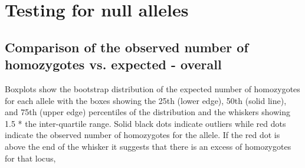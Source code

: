 \documentclass[a4paper]{scrartcl}\usepackage[]{graphicx}\usepackage[]{color}
\begin{document}
\FloatBarrier

\FloatBarrier

\FloatBarrier

\section{Testing for null alleles}




\subsection{Comparison of the observed number of homozygotes vs. expected - overall}
Boxplots show the bootstrap distribution of the expected number of homozygotes for each allele with the boxes showing the 25th (lower edge), 50th (solid line), and 75th (upper edge) percentiles of the distribution and the whiskers showing 1.5 * the inter-quartile range. Solid black dots indicate outliers while red dots indicate the observed number of homozygotes for the allele. If the red dot is above the end of the whisker it suggests that there is an excess of homozygotes for that locus, 
\end{document}
